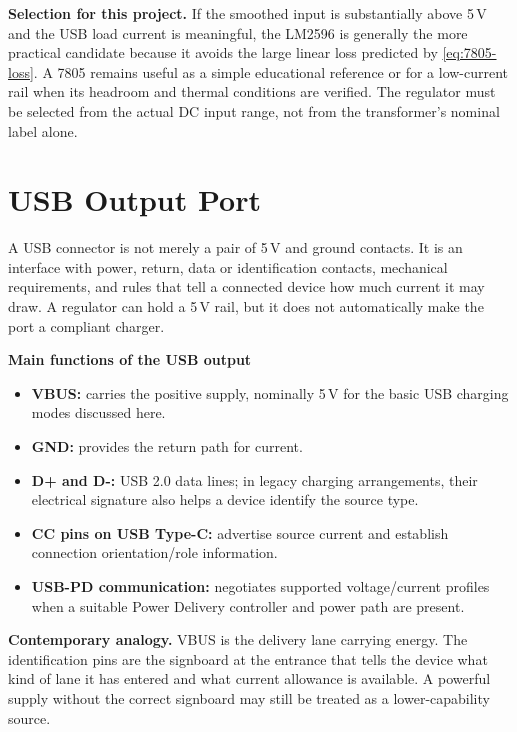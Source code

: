 \documentclass[journal,12pt,twocolumn]{IEEEtran}
\begin{document}
\textbf{Selection for this project.} If the smoothed input is
substantially above 5\,V and the USB load current is meaningful,
the LM2596 is generally the more practical candidate because it
avoids the large linear loss predicted by
\eqref{eq:7805-loss}. A 7805 remains useful as a simple educational
reference or for a low-current rail when its headroom and thermal
conditions are verified. The regulator must be selected from the
actual DC input range, not from the transformer's nominal label
alone.

\section{USB Output Port}
A USB connector is not merely a pair of 5\,V and ground contacts.
It is an interface with power, return, data or identification
contacts, mechanical requirements, and rules that tell a connected
device how much current it may draw. A regulator can hold a 5\,V
rail, but it does not automatically make the port a compliant
charger.

\textbf{Main functions of the USB output}
\begin{itemize}[leftmargin=1.5em]
    \item \textbf{VBUS:} carries the positive supply, nominally 5\,V
    for the basic USB charging modes discussed here.
    \item \textbf{GND:} provides the return path for current.
    \item \textbf{D+ and D-:} USB 2.0 data lines; in legacy charging
    arrangements, their electrical signature also helps a device
    identify the source type.
    \item \textbf{CC pins on USB Type-C:} advertise source current
    and establish connection orientation/role information.
    \item \textbf{USB-PD communication:} negotiates supported
    voltage/current profiles when a suitable Power Delivery
    controller and power path are present.
\end{itemize}

\textbf{Contemporary analogy.} VBUS is the delivery lane carrying
energy. The identification pins are the signboard at the entrance
that tells the device what kind of lane it has entered and what
current allowance is available. A powerful supply without the
correct signboard may still be treated as a lower-capability source.
\end{document}
